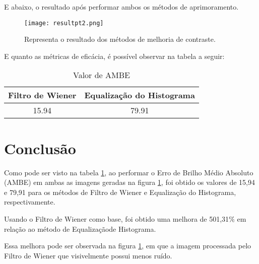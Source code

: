 \documentclass[conference]{IEEEtran}
\begin{document}
E abaixo, o resultado após performar ambos os métodos de aprimoramento.

\begin{figure}[H]
    \centering
    \texttt{[image: resultpt2.png]}
    \caption{Representa o resultado dos métodos de melhoria de contraste.}
    \label{fig:label2}
\end{figure}

E quanto as métricas de eficácia, é possível observar na tabela a seguir:

\begin{table}[H]
\renewcommand{\arraystretch}{1.3}
\caption{Valor de AMBE}
\label{table1}
\centering
\begin{tabular}{c||c}
\hline
\bfseries Filtro de Wiener &
\bfseries Equalização do Histograma \\
\hline\hline
15.94 & 79.91 \\
\hline
\end{tabular}
\end{table}

\section{Conclusão}

Como pode ser visto na tabela \ref{table1}, ao performar o Erro de Brilho Médio Absoluto (AMBE) em ambas as imagens geradas na figura \ref{fig:label2}, foi obtido os valores de 15,94 e 79,91 para os métodos de Filtro de Wiener  e Equalização do Histograma, respectivamente.

Usando o Filtro de Wiener como base, foi obtido uma melhora de 501,31\(\%\) em relação ao método de Equalizaçãode Histograma. 

Essa melhora pode ser observada na figura \ref{fig:label2}, em que a imagem processada pelo Filtro de Wiener que visivelmente possui menos ruído.
\end{document}
